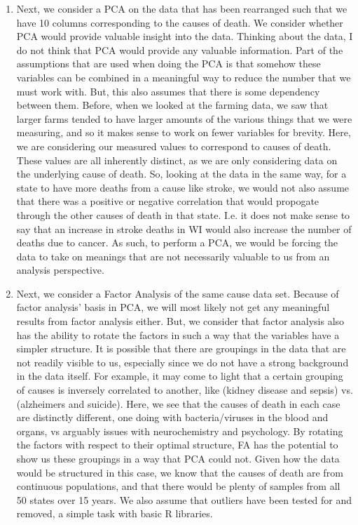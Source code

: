 \documentclass[letterpaper,10pt]{article}
\begin{document}
\begin{enumerate}
\begin{enumerate}
\item Next, we consider a PCA on the data that has been rearranged such that we have 10 columns corresponding to the causes of death. We consider whether PCA would provide valuable insight into the data. Thinking about the data, I do not think that PCA would provide any valuable information. Part of the assumptions that are used when doing the PCA is that somehow these variables can be combined in a meaningful way to reduce the number that we must work with. But, this also assumes that there is some dependency between them. Before, when we looked at the farming data, we saw that larger farms tended to have larger amounts of the various things that we were measuring, and so it makes sense to work on fewer variables for brevity. Here, we are considering our measured values to correspond to causes of death. These values are all inherently distinct, as we are only considering data on the underlying cause of death. So, looking at the data in the same way, for a state to have more deaths from a cause like stroke, we would not also assume that there was a positive or negative correlation that would propogate through the other causes of death in that state. I.e. it does not make sense to say that an increase in stroke deaths in WI would also increase the number of deaths due to cancer. As such, to perform a PCA, we would be forcing the data to take on meanings that are not necessarily valuable to us from an analysis perspective.
\item Next, we consider a Factor Analysis of the same cause data set. Because of factor analysis' basis in PCA, we will most likely not get any meaningful results from factor analysis either. But, we consider that factor analysis also has the ability to rotate the factors in such a way that the variables have a simpler structure. It is possible that there are groupings in the data that are not readily visible to us, especially since we do not have a strong background in the data itself. For example, it may come to light that a certain grouping of causes is inversely correlated to another, like (kidney disease and sepsis) vs. (alzheimers and suicide). Here, we see that the causes of death in each case are distinctly different, one doing with bacteria/viruses in the blood and organs, vs arguably issues with neurochemistry and psychology. By rotating the factors with respect to their optimal structure, FA has the potential to show us these groupings in a way that PCA could not. Given how the data would be structured in this case, we know that the causes of death are from continuous populations, and that there would be plenty of samples from all 50 states over 15 years. We also assume that outliers have been tested for and removed, a simple task with basic R libraries.

\end{enumerate}
\end{enumerate}
\end{document}
